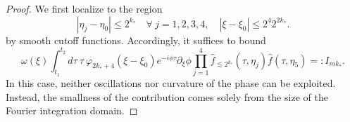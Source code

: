 \documentclass[reqno,english,11pt]{amsart}
\theoremstyle{definition}
\numberwithin{equation}{section}
\begin{document}
\begin{proof}
 We first localize to the region
\begin{equation*}
\left|\eta_{j}-\eta_0\right| \leq 2^{k_{*}} \quad \forall \ j=1,2,3,4, \quad \left|\xi-\xi_0\right| \leq 2^{4}2^{2k_{*}}.
\end{equation*} 
by smooth cutoff functions. Accordingly, it suffices to bound
\begin{equation}
         \omega(\xi)\int_{t_1}^{t_2}d\tau \ \tau\ \varphi_{2k_{*}+4}\left(\xi-\xi_0\right)e^{-i\phi \tau} \partial_{\xi}\phi \prod^4_{j=1} \widehat{f}_{\lesssim 2^{k_{*}}} \left(\tau,\eta_{j}\right)  
    \widehat{f}\left(\tau,\eta_{5}\right)=:I_{mk_{*}}.
\end{equation}
In this case, neither oscillations nor curvature of the phase can be exploited. Instead, the smallness of the contribution comes solely from the size of the Fourier integration domain.



\end{proof}
\end{document}
